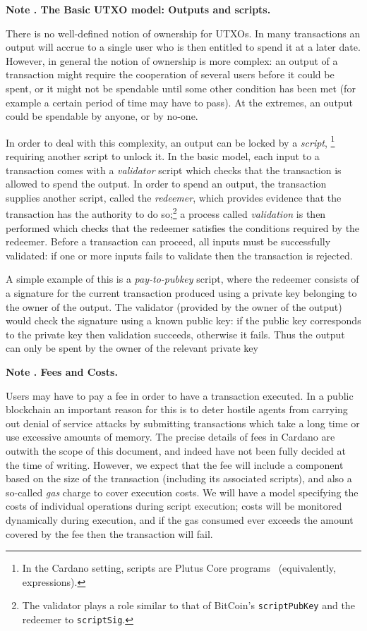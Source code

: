 \documentclass[a4paper]{article}
\newcounter{note}
\newcommand{\note}[1]{
  \bigskip
  \refstepcounter{note}
  \noindent\textbf{Note \thenote. #1}
}
\renewcommand{\i}{\textit}  %
\begin{document}
\note{The Basic UTXO model: Outputs and scripts.}
\label{note:basic-utxo}
There is no well-defined notion of ownership for UTXOs.  In many
transactions an output will accrue to a single user who is then
entitled to spend it at a later date.  However, in general the notion
of ownership is more complex: an output of a transaction might require
the cooperation of several users before it could be spent, or it might
not be spendable until some other condition has been met (for example
a certain period of time may have to pass).  At the extremes, an
output could be spendable by anyone, or by no-one.

In order to deal with this complexity, an output can be locked by a
\textit{script},%
\footnote{In the Cardano setting, scripts are Plutus Core
  programs~\citep{Plutus-Core-spec} (equivalently, expressions).  }
requiring another script to unlock it.  In the basic model, each input
to a transaction comes with a \i{validator} script which checks that
the transaction is allowed to spend the output. In order to spend an
output, the transaction supplies another script, called the
\i{redeemer}, which provides evidence that the transaction has the
authority to do so;\footnote{The validator plays a role similar to
  that of BitCoin's \texttt{scriptPubKey} and the redeemer to
  \texttt{scriptSig}.  } a process called \i{validation} is then
performed which checks that the redeemer satisfies the conditions
required by the redeemer. Before a transaction can proceed, all inputs
must be successfully validated: if one or more inputs fails to
validate then the transaction is rejected.

A simple example of this is a \i{pay-to-pubkey} script, where the
redeemer consists of a signature for the current transaction produced
using a private key belonging to the owner of the output.  The
validator (provided by the owner of the output) would check the
signature using a known public key: if the public key corresponds to
the private key then validation succeeds, otherwise it fails.  Thus
the output can only be spent by the owner of the relevant private key


\note{Fees and Costs.}
\label{note:fees}
Users may have to pay a fee in order to have a transaction executed.
In a public blockchain an important reason for this is to deter
hostile agents from carrying out denial of service attacks by
submitting transactions which take a long time or use excessive
amounts of memory.  The precise details of fees in Cardano are outwith
the scope of this document, and indeed have not been fully decided at
the time of writing. However, we expect that the fee will include a
component based on the size of the transaction (including its
associated scripts), and also a so-called \textit{gas} charge to cover
execution costs.  We will have a model specifying the costs of
individual operations during script execution; costs will be monitored
dynamically during execution, and if the gas consumed ever exceeds the
amount covered by the fee then the transaction will fail.
\end{document}
